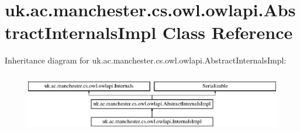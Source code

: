 \hypertarget{classuk_1_1ac_1_1manchester_1_1cs_1_1owl_1_1owlapi_1_1_abstract_internals_impl}{\section{uk.\-ac.\-manchester.\-cs.\-owl.\-owlapi.\-Abstract\-Internals\-Impl Class Reference}
\label{classuk_1_1ac_1_1manchester_1_1cs_1_1owl_1_1owlapi_1_1_abstract_internals_impl}
}
Inheritance diagram for uk.\-ac.\-manchester.\-cs.\-owl.\-owlapi.\-Abstract\-Internals\-Impl\-:\begin{figure}[H]
\begin{center}
\leavevmode
\includegraphics[height=2.616822cm]{classuk_1_1ac_1_1manchester_1_1cs_1_1owl_1_1owlapi_1_1_abstract_internals_impl}
\end{center}
\end{figure}
